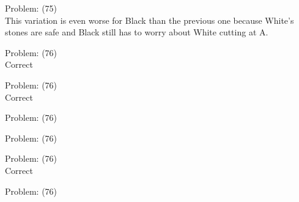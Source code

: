 \documentclass[11pt]{article}
\begin{document}
\begin{minipage}[t]{0.5\textwidth}
  {\centering
  
  Problem: (75)\\
  This variation is even worse for Black than the previous one because White's stones are safe and Black still has to worry about White cutting at A.\\
  }
\end{minipage}
\begin{minipage}[t]{0.5\textwidth}
  {\centering
  
  Problem: (76)\\
  Correct\\
  }
\end{minipage}
\begin{minipage}[t]{0.5\textwidth}
  {\centering
  
  Problem: (76)\\
  Correct\\
  }
\end{minipage}
\begin{minipage}[t]{0.5\textwidth}
  {\centering
  
  Problem: (76)\\
  
  }
\end{minipage}
\begin{minipage}[t]{0.5\textwidth}
  {\centering
  
  Problem: (76)\\
  
  }
\end{minipage}
\begin{minipage}[t]{0.5\textwidth}
  {\centering
  
  Problem: (76)\\
  Correct\\
  }
\end{minipage}
\begin{minipage}[t]{0.5\textwidth}
  {\centering
  
  Problem: (76)\\
  
  }
\end{minipage}
\end{document}
